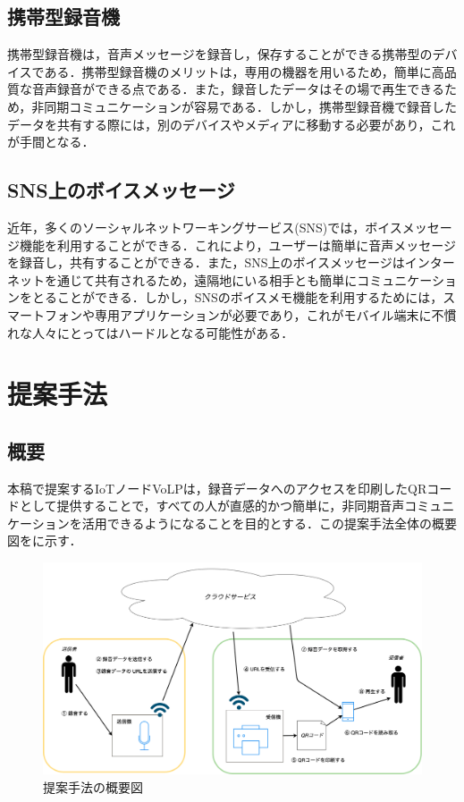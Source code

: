 \documentclass[submit,techrep,noauthor]{ipsj}
\begin{document}
\subsection{携帯型録音機}
携帯型録音機は，音声メッセージを録音し，保存することができる携帯型のデバイスである．携帯型録音機のメリットは，専用の機器を用いるため，簡単に高品質な音声録音ができる点である．また，録音したデータはその場で再生できるため，非同期コミュニケーションが容易である．しかし，携帯型録音機で録音したデータを共有する際には，別のデバイスやメディアに移動する必要があり，これが手間となる．

\subsection{SNS上のボイスメッセージ}
近年，多くのソーシャルネットワーキングサービス(SNS)では，ボイスメッセージ機能を利用することができる．これにより，ユーザーは簡単に音声メッセージを録音し，共有することができる．また，SNS上のボイスメッセージはインターネットを通じて共有されるため，遠隔地にいる相手とも簡単にコミュニケーションをとることができる．しかし，SNSのボイスメモ機能を利用するためには，スマートフォンや専用アプリケーションが必要であり，これがモバイル端末に不慣れな人々にとってはハードルとなる可能性がある．

\section{提案手法}
\label{system}
\subsection{概要}
本稿で提案するIoTノードVoLPは，録音データへのアクセスを印刷したQRコードとして提供することで，すべての人が直感的かつ簡単に，非同期音声コミュニケーションを活用できるようになることを目的とする．この提案手法全体の概要図をに示す．\par

\begin{figure}[tb]
\includegraphics[scale=0.15,bb= 0 0 2000 1000]{image/system_drawio.png}
\caption{提案手法の概要図}
\label{fig:sys-overview}
\end{figure}
\end{document}
